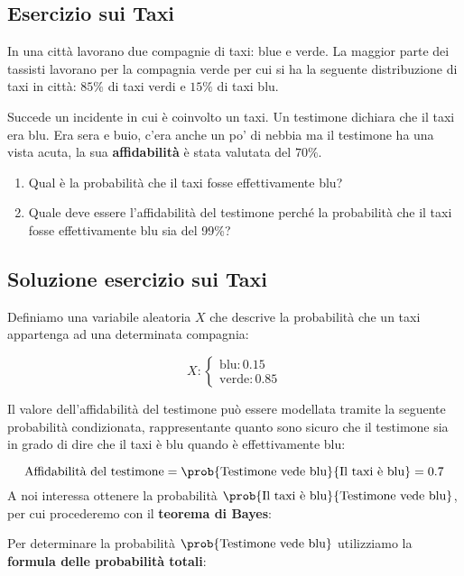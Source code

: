 \documentclass[\main/main.tex]{subfiles}
\begin{document}
\subsection{Esercizio sui Taxi}
In una città lavorano due compagnie di taxi: blue e verde.
La maggior parte dei tassisti lavorano per la compagnia verde per cui si ha la seguente distribuzione di taxi in città: $85\%$ di taxi verdi e $15\%$ di taxi blu.

Succede un incidente in cui è coinvolto un taxi. Un testimone dichiara che il taxi era blu. Era sera e buio, c'era anche un po' di nebbia ma il testimone ha una vista acuta, la sua \textbf{affidabilità} è stata valutata del $70\%$.

\begin{enumerate}
  \item Qual è la probabilità che il taxi fosse effettivamente blu?
  \item Quale deve essere l'affidabilità del testimone perché la probabilità che il taxi fosse effettivamente blu sia del 99\%?
\end{enumerate}

\subsection{Soluzione esercizio sui Taxi}
Definiamo una variabile aleatoria $X$ che descrive la probabilità che un taxi appartenga ad una determinata compagnia:

\[
  X: \begin{cases}
    \text{blu}: 0.15 \\
    \text{verde}: 0.85
  \end{cases}
\]

Il valore dell'affidabilità del testimone può essere modellata tramite la seguente probabilità condizionata, rappresentante quanto sono sicuro che il testimone sia in grado di dire che il taxi è blu quando è effettivamente blu:

\[
  \text{Affidabilità del testimone} = \prob{\text{Testimone vede blu}}{\text{Il taxi è blu}} = 0.7
\]
A noi interessa ottenere la probabilità $\prob{\text{Il taxi è blu}}{\text{Testimone vede blu}}$, per cui procederemo con il \textbf{teorema di Bayes}:

\bayesTh

Per determinare la probabilità $\prob{\text{Testimone vede blu}}$ utilizziamo la \textbf{formula delle probabilità totali}:

\formulaProbTot
\end{document}
